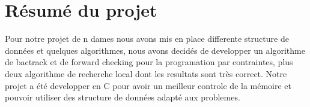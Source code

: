 \section{Résumé du projet}
 
Pour notre projet de n dames nous avons mis en place differente structure de données et quelques algorithmes, nous avons decidés de developper un algorithme de bactrack et de forward checking pour la programation par contraintes, plus deux algorithme de recherche local dont les resultats sont très correct. Notre projet a été developper en C pour avoir un meilleur controle de la mémoire et pouvoir utiliser des structure de données adapté aux problemes.  